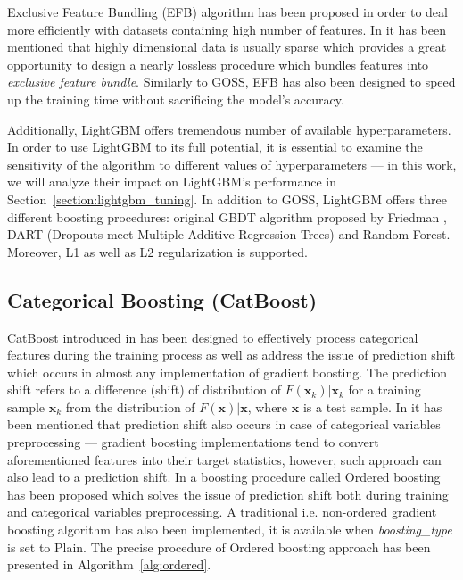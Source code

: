 \documentclass[magisterska, english]{pwr_wmat_praca_dyplomowa}
\theoremstyle{plain}
\numberwithin{theorem}{chapter}
\theoremstyle{definition}
\numberwithin{theorem}{chapter}
\begin{document}
Exclusive Feature Bundling (EFB) algorithm has been proposed in order to deal more efficiently with datasets containing high number of features. In \cite{lightgbm} it has been mentioned that highly dimensional data is usually sparse which provides a great opportunity to design a nearly lossless procedure which bundles features into \emph{exclusive feature bundle}. Similarly to GOSS, EFB has also been designed to speed up the training time without sacrificing the model's accuracy.

Additionally, LightGBM offers tremendous number of available hyperparameters. In order to use LightGBM to its full potential, it is essential to examine the sensitivity of the algorithm to different values of hyperparameters --- in this work, we will analyze their impact on LightGBM's performance in Section~\ref{section:lightgbm_tuning}. In addition to GOSS, LightGBM offers three different boosting procedures: original GBDT algorithm proposed by Friedman \cite{friedman_gbm}, DART (Dropouts meet Multiple Additive Regression Trees) and Random Forest. Moreover, L1 as well as L2 regularization is supported.

\subsection{Categorical Boosting (CatBoost)}
CatBoost introduced in \cite{catboost} has been designed to effectively process categorical features during the training process as well as address the issue of prediction shift which occurs in almost any implementation of gradient boosting. The prediction shift refers to a difference (shift) of distribution of $F(\mathbf{x}_k)|\mathbf{x}_k$ for a training sample $\mathbf{x}_k$ from the distribution of $F(\mathbf{x})|\mathbf{x}$, where $\mathbf{x}$ is a test sample. In \cite{catboost} it has been mentioned that prediction shift also occurs in case of categorical variables preprocessing --- gradient boosting implementations tend to convert aforementioned features into their target statistics, however, such approach can also lead to a prediction shift. In \cite{catboost} a boosting procedure called Ordered boosting has been proposed which solves the issue of prediction shift both during training and categorical variables preprocessing. A traditional i.e. non-ordered gradient boosting algorithm has also been implemented, it is available when \emph{boosting\_type} is set to Plain. The precise procedure of Ordered boosting approach has been presented in Algorithm~\ref{alg:ordered}.
\end{document}
